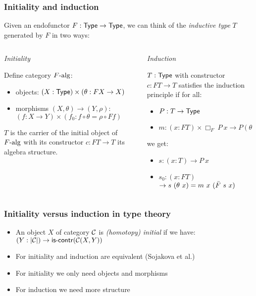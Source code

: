 \documentclass{beamer}
\begin{document}
\begin{frame}
  \frametitle{Initiality and induction}
  Given an endofunctor $F : \mathsf{Type} \to \mathsf{Type}$, we can think of the
  \emph{inductive type} $T$ generated by $F$ in two ways:

  \begin{columns}
    \begin{column}[t]{0.5\textwidth}
      \emph{Initiality}

      Define category $F\mbox{-alg}$:
      \begin{itemize}
      \item objects: $(X : \mathsf{Type}) \times (\theta : FX \to X)$
      \item morphisms $(X,\theta) \to (Y,\rho)$:
        $(f : X \to Y) \times (f_0 : f \circ \theta = \rho \circ Ff)$
      \end{itemize}

      $T$ is the carrier of the initial object of $F\mbox{-alg}$ with
      its constructor $c : FT \to T$ its algebra structure.
    \end{column}
    \begin{column}[t]{0.5\textwidth}
      \emph{Induction}

      $T : \mathsf{Type}$ with constructor $c : FT \to T$ satisfies the
      induction principle if for all:

      \begin{itemize}
      \item $P : T \to \mathsf{Type}$
      \item $m : (x : FT) \times \Box_F\ P\ x \to P (\theta\ x)$
      \end{itemize}

      we get:

      \begin{itemize}
      \item $s : (x : T) \to P\ x$
      \item $s_0 : (x : FT)$\\
        $\to s\ (\theta\ x) = m\ x\ (\actionsection{F}\ s\ x)$
      \end{itemize}
    \end{column}
  \end{columns}
\end{frame}

\begin{frame}
  \frametitle{Initiality versus induction in type theory}
  \begin{itemize}
  \item An object $X$ of category $\mathcal{C}$ is \emph{(homotopy) initial} if we have:
    $(Y : | \mathcal{C} |) \to \operatorname{\mathsf{is-contr}}(\mathcal{C}(X,Y))$
  \item For \oits initiality and induction are equivalent (Sojakova et
    al.) 
  \item For initiality we only need objects and morphisms
  \item For induction we need more structure
  \end{itemize}
\end{frame}
\end{document}
